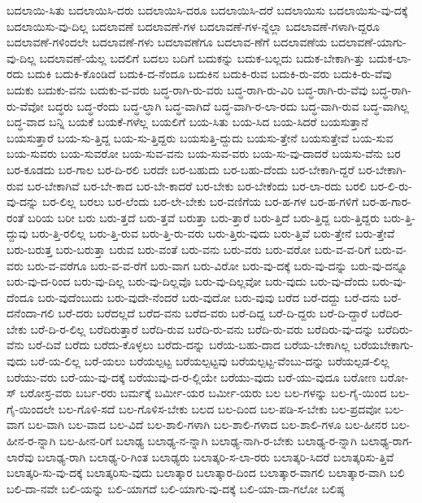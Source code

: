 {ಬದಲಾಯಿ-ಸಿತು
ಬದಲಾಯಿಸಿ-ದರು
ಬದಲಾಯಿಸಿ-ದರೂ
ಬದಲಾಯಿಸಿ-ದರೆ
ಬದಲಾಯಿಸು
ಬದಲಾಯಿಸು-ವು-ದಕ್ಕೆ
ಬದಲಾಯಿಸು-ವು-ದಿಲ್ಲ
ಬದಲಾವಣೆ
ಬದಲಾವಣೆ-ಗಳ
ಬದಲಾವಣೆ-ಗಳ-ನ್ನೆಲ್ಲಾ
ಬದಲಾವಣೆ-ಗಳಾಗಿ-ದ್ದರೂ
ಬದಲಾವಣೆ-ಗಳಿಂದಲೇ
ಬದಲಾವಣೆ-ಗಳು
ಬದಲಾವಣೆಗೂ
ಬದಲಾವ-ಣೆಗೆ
ಬದಲಾವಣೆಯ
ಬದಲಾವಣೆ-ಯಾಗು-ವು-ದಿಲ್ಲ
ಬದಲಾವಣೆ-ಯೆಲ್ಲ
ಬದಲಿಗೆ
ಬದಲು
ಬದಿಗೆ
ಬದುಕನ್ನು
ಬದುಕ-ಬಲ್ಲದು
ಬದುಕ-ಬೇಕಾಗಿ-ತ್ತು
ಬದುಕ-ಲಾ-ರದು
ಬದುಕಿ
ಬದುಕಿ-ಕೊಂಡಿದೆ
ಬದುಕಿ-ದ-ನೆಂದೂ
ಬದುಕಿನ
ಬದುಕಿ-ರುವ
ಬದುಕಿ-ರು-ವರು
ಬದುಕಿ-ರು-ವೆವು
ಬದುಕು
ಬದುಕು-ವನು
ಬದುಕು-ವ-ವರು
ಬದ್ಧ-ರಾಗಿ-ರು-ವರು
ಬದ್ಧ-ರಾಗಿ-ರು-ವಿರಿ
ಬದ್ಧ-ರಾಗಿ-ರು-ವೆವು
ಬದ್ಧ-ರಾಗಿ-ರು-ವೆವೋ
ಬದ್ಧರು
ಬದ್ಧ-ರೆಂದು
ಬದ್ಧ-ಲ್ಧಾಗಿ
ಬದ್ಧ-ವಾಗಿದೆ
ಬದ್ಧ-ವಾಗಿ-ರ-ಲಾ-ರದು
ಬದ್ಧ-ವಾಗಿ-ರುವ
ಬದ್ಧ-ವಾಗಿಲ್ಲ
ಬದ್ಧ-ವಾದ
ಬನ್ನಿ
ಬಯಕೆ
ಬಯಕೆ-ಗಳೆಲ್ಲ
ಬಯಲಿಗೆ
ಬಯ-ಸಿತು
ಬಯ-ಸಿದ
ಬಯ-ಸಿದರೆ
ಬಯಸುತ್ತಾನೆ
ಬಯಸುತ್ತಾರೆ
ಬಯ-ಸು-ತ್ತಿದ್ದ
ಬಯ-ಸು-ತ್ತಿದ್ದರು
ಬಯಸುತ್ತಿ-ದ್ದುದು
ಬಯಸು-ತ್ತೇನೆ
ಬಯಸುತ್ತೇವೆ
ಬಯ-ಸುವ
ಬಯ-ಸುವರು
ಬಯ-ಸುವರೋ
ಬಯ-ಸುವ-ವನು
ಬಯ-ಸುವ-ವರು
ಬಯ-ಸು-ವು-ದಾದರೆ
ಬಯಸು-ವೆನು
ಬರ
ಬರ-ಕೂಡದು
ಬರ-ಗಾಲ
ಬರ-ದಿ-ರಲಿ
ಬರದೇ
ಬರ-ಬಹುದು
ಬರ-ಬಹು-ದೆಂದು
ಬರ-ಬೇಕಾಗಿ-ದ್ದರೆ
ಬರ-ಬೇಕಾಗಿ-ರುವ
ಬರ-ಬೇಕಾಗಿವೆ
ಬರ-ಬೇ-ಕಾದ
ಬರ-ಬೇ-ಕಾದರೆ
ಬರ-ಬೇಕು
ಬರ-ಬೇಕೆಂದು
ಬರ-ಲಾ-ರದು
ಬರಲಿ
ಬರ-ಲಿ-ರು-ವು-ದನ್ನು
ಬರ-ಲಿಲ್ಲ
ಬರಲು
ಬರ-ಲೆಂದು
ಬರ-ಲೇ-ಬೇಕು
ಬರ-ವಣಿಗೆಯ
ಬರ-ಹ-ಗಳ
ಬರ-ಹ-ಗಳಿಗೆ
ಬರ-ಹ-ಗಾರ-ರಂತೆ
ಬರಿಯ
ಬರೀ
ಬರು
ಬರು-ತ್ತದೆ
ಬರು-ತ್ತವೆ
ಬರುತ್ತಾ
ಬರು-ತ್ತಾರೆ
ಬರು-ತ್ತಿದೆ
ಬರು-ತ್ತಿದ್ದ
ಬರು-ತ್ತಿದ್ದರು
ಬರು-ತ್ತಿ-ದ್ದುವು
ಬರು-ತ್ತಿ-ರಲಿಲ್ಲ
ಬರು-ತ್ತಿ-ರುವ
ಬರು-ತ್ತಿ-ರು-ವರು
ಬರು-ತ್ತಿರು-ವುದು
ಬರು-ತ್ತಿವೆ
ಬರು-ತ್ತೇನೆ
ಬರು-ತ್ತೇವೆ
ಬರು-ಬರುತ್ತ
ಬರು-ಬರುತ್ತಾ
ಬರುವ
ಬರು-ವಂತೆ
ಬರು-ವನು
ಬರು-ವರು
ಬರು-ವರೋ
ಬರು-ವ-ವ-ರಿಗೆ
ಬರು-ವ-ವರು
ಬರು-ವ-ವರೆಗೂ
ಬರು-ವ-ವ-ರೆಗೆ
ಬರು-ವಾಗ
ಬರು-ವಿರೋ
ಬರು-ವು-ದಕ್ಕೆ
ಬರು-ವು-ದನ್ನು
ಬರು-ವು-ದನ್ನೂ
ಬರು-ವು-ದ-ರಿಂದ
ಬರು-ವು-ದಿಲ್ಲ
ಬರು-ವು-ದಿಲ್ಲವೊ
ಬರು-ವು-ದಿಲ್ಲವೋ
ಬರು-ವುದು
ಬರು-ವು-ದೆಂದು
ಬರು-ವು-ದೆಂದೂ
ಬರು-ವುದೆಂಬುದು
ಬರು-ವುದೇ-ನೆಂದರೆ
ಬರು-ವುದೋ
ಬರು-ವುವು
ಬರೆದ
ಬರೆ-ದದ್ದು
ಬರೆ-ದನು
ಬರೆ-ದನೆಂದಾ-ಗಲಿ
ಬರೆ-ದರು
ಬರೆದಲ್ಲದೆ
ಬರೆದ-ವನು
ಬರೆದ-ವರು
ಬರೆ-ದಿದ್ದ
ಬರೆ-ದಿ-ದ್ದರು
ಬರೆ-ದಿ-ದ್ದಾರೆ
ಬರೆದಿರ-ಬೇಕು
ಬರೆ-ದಿ-ರ-ಲಿಲ್ಲ
ಬರೆದಿರುತ್ತಾರೆ
ಬರೆದಿ-ರುವ
ಬರೆದಿ-ರು-ವನು
ಬರೆದಿ-ರು-ವರು
ಬರೆದಿರು-ವು-ದನ್ನು
ಬರೆದಿರು-ವೆನು
ಬರೆ-ದಿವೆ
ಬರೆದು
ಬರೆದು-ಕೊಳ್ಳಲು
ಬರೆದು-ದನ್ನು
ಬರೆಯ-ಬಹು-ದಾದ
ಬರೆಯ-ಬೇಕಾಗಿಲ್ಲ
ಬರೆಯಬೇಕಾಗು-ವುದು
ಬರೆ-ಯ-ಲಿಲ್ಲ
ಬರೆ-ಯಲು
ಬರೆಯಲ್ಪಟ್ಟ
ಬರೆಯಲ್ಪಟ್ಟವು
ಬರೆಯಲ್ಪಟ್ಟ-ವೆಂಬು-ದನ್ನು
ಬರೆಯಲ್ಪಡ-ಲಿಲ್ಲ
ಬರೆಯು-ವರು
ಬರೆ-ಯು-ವು-ದಕ್ಕೆ
ಬರೆಯುವು-ದ-ರ-ಲ್ಲಿಯೇ
ಬರೆಯು-ವುದು
ಬರೆ-ಯು-ವುದೂ
ಬರೋಣ
ಬರೋ-ಸ್
ಬರೋಸ್ರ-ವರು
ಬರ್ಬ-ರರು
ಬರ್ಮಕ್ಕೆ
ಬರ್ಮೀ-ಯರ
ಬರ್ಮೀ-ಯರು
ಬಲ
ಬಲ-ಗಳನ್ನು
ಬಲ-ಗೈ-ಯಿಂದ
ಬಲ-ಗೈ-ಯಿಂದಲೇ
ಬಲ-ಗೊಳಿ-ಸದೆ
ಬಲ-ಗೊಳಿಸ-ಬೇಕು
ಬಲದ
ಬಲ-ದಿಂದ
ಬಲ-ಪಡಿ-ಸ-ಬೇಕು
ಬಲ-ಪ್ರದವೋ
ಬಲ-ವಾಗ
ಬಲ-ವಾಗಿ
ಬಲ-ವಾದ
ಬಲ-ವಿದೆ
ಬಲ-ಶಾಲಿ-ಗಳಾಗಿ
ಬಲ-ಶಾಲಿ-ಗಳಾದ
ಬಲ-ಶಾಲಿ-ಗಳೂ
ಬಲ-ಹೀನರ
ಬಲ-ಹೀನ-ರ-ನ್ನಾಗಿ
ಬಲ-ಹೀನ-ರಿಗೆ
ಬಲಾಢ್ಯ
ಬಲಾಢ್ಯ-ನ-ನ್ನಾಗಿ
ಬಲಾಢ್ಯ-ನಾಗಿ-ರ-ಬೇಕು
ಬಲಾಢ್ಯ-ರ-ನ್ನಾಗಿ
ಬಲಾಢ್ಯ-ರಾಗ-ಲಾರೆವು
ಬಲಾಢ್ಯ-ರಾಗಿ
ಬಲಾಢ್ಯ-ರಿ-ಗಿಂತ
ಬಲಾಢ್ಯರು
ಬಲಾತ್ಕರಿ-ಸ-ಲಾ-ರರು
ಬಲಾತ್ಕರಿ-ಸಿದರೆ
ಬಲಾತ್ಕರಿಸು-ತ್ತಿವೆ
ಬಲಾತ್ಕರಿ-ಸು-ವು-ದಕ್ಕೆ
ಬಲಾತ್ಕರಿಸು-ವುದು
ಬಲಾತ್ಕಾರ
ಬಲಾತ್ಕಾರ-ದಿಂದ
ಬಲಾತ್ಕಾರ-ವಾಗಲಿ
ಬಲಾತ್ಕಾರ-ವಾಗಿ
ಬಲಿ
ಬಲಿ-ದಾ-ನವೇ
ಬಲಿ-ಯನ್ನು
ಬಲಿ-ಯಾಗದೆ
ಬಲಿ-ಯಾಗು-ವು-ದಕ್ಕೆ
ಬಲಿ-ಯಾ-ದಾ-ಗಲೋ
ಬಲಿಷ್ಠ
}
